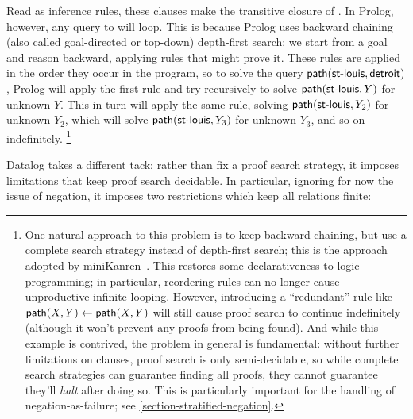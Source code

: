 \noindent
Read as inference rules, these clauses make  the transitive closure
of .
%
In Prolog, however, any query to  will loop.
%
This is because Prolog uses backward chaining (also called goal-directed or
top-down) depth-first search: we start from a goal and reason backward, applying
rules that might prove it.
%
These rules are applied in the order they occur in the program, so to solve the
query $\text{\sffamily path}({\textsf{st-louis}, \textsf{detroit}})$, Prolog will apply the
first rule and try recursively to solve $\text{\sffamily path}({\textsf{st-louis},Y})$ for
unknown $Y$.
%
This in turn will apply the same rule, solving $\text{\sffamily path}({\textsf{st-louis},
  Y_2})$ for unknown $Y_2$, which will solve $\text{\sffamily path}({\textsf{st-louis}, Y_3})$
for unknown $Y_3$, and so on indefinitely.%
%
\footnote{One natural approach to this problem is to keep backward chaining, but
  use a complete search strategy instead of depth-first search; this is the
  approach adopted by miniKanren~\citep{kanren}. This restores some
  declarativeness to logic programming; in particular, reordering rules can no
  longer cause unproductive infinite looping. However, introducing a
  ``redundant'' rule like $\text{\sffamily path}({X,Y}) \gets \text{\sffamily path}({X,Y})$ will still
  cause proof search to continue indefinitely (although it won't prevent any
  proofs from being found). And while this example is contrived, the problem in
  general is fundamental: without further limitations on clauses, proof search
  is only semi-decidable, so while complete search strategies can guarantee
  finding all proofs, they cannot guarantee they'll \emph{halt} after doing so.
  This is particularly important for the handling of negation-as-failure; see
  \cref{section-stratified-negation}.}

Datalog takes a different tack: rather than fix a proof search strategy, it
imposes limitations that keep proof search decidable. In particular, ignoring
for now the issue of negation, it imposes two restrictions which keep all
 relations finite:

